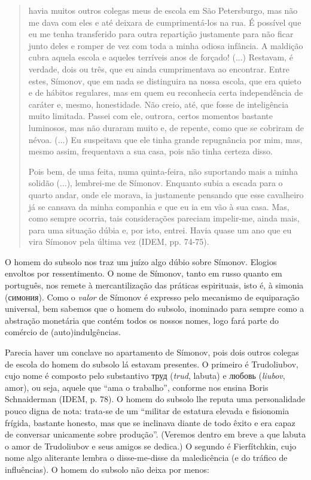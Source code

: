 \begin{quote}
havia muitos outros colegas meus de escola em São Petersburgo, mas não
me dava com eles e até deixara de cumprimentá-los na rua. É possível que
eu me tenha transferido para outra repartição justamente para não ficar
junto deles e romper de vez com toda a minha odiosa infância. A maldição
cubra aquela escola e aqueles terríveis anos de forçado! (...) Restavam,
é verdade, dois ou três, que eu ainda cumprimentava ao encontrar. Entre
estes, Símonov, que em nada se distinguira na nossa escola, que era
quieto e de hábitos regulares, mas em quem eu reconhecia certa
independência de caráter e, mesmo, honestidade. Não creio, até, que
fosse de inteligência muito limitada. Passei com ele, outrora, certos
momentos bastante luminosos, mas não duraram muito e, de repente, como
que se cobriram de névoa. (...) Eu suspeitava que ele tinha grande
repugnância por mim, mas, mesmo assim, frequentava a sua casa, pois não
tinha certeza disso.

Pois bem, de uma feita, numa quinta-feira, não suportando mais a minha
solidão (...), lembrei-me de Símonov. Enquanto subia a escada para o
quarto andar, onde ele morava, ia justamente pensando que esse
cavalheiro já se cansava da minha companhia e que eu ia em vão à sua
casa. Mas, como sempre ocorria, tais considerações pareciam impelir-me,
ainda mais, para uma situação dúbia e, por isto, entrei. Havia quase um
ano que eu vira Símonov pela última vez (IDEM, pp. 74-75).
\end{quote}

O homem do subsolo nos traz um juízo algo dúbio sobre Símonov. Elogios
envoltos por ressentimento. O nome de Símonov, tanto em russo quanto em
português, nos remete à mercantilização das práticas espirituais, isto
é, à simonia
(симония). Como o
\emph{valor} de Símonov é expresso pelo mecanismo de equiparação
universal, bem sabemos que o homem do subsolo, inominado para sempre
como a abstração monetária que contém todos os nossos nomes, logo fará
parte do comércio de (auto)indulgências.

Parecia haver um conclave no apartamento de Símonov, pois dois outros
colegas de escola do homem do subsolo lá estavam presentes. O primeiro é
Trudoliubov, cujo nome é composto pelo substantivo
труд (\emph{trud},
labuta) e любовь
(\emph{liubov}, amor), ou seja, aquele que ``ama o trabalho'', conforme
nos ensina Boris Schnaiderman (IDEM, p. 78). O homem do subsolo lhe
reputa uma personalidade pouco digna de nota: trata-se de um ``militar
de estatura elevada e fisionomia frígida, bastante honesto, mas que se
inclinava diante de todo êxito e era capaz de conversar unicamente sobre
produção''. (Veremos dentro em breve a que labuta o amor de Trudoliubov
e seus amigos se dedica.) O segundo é Fierfítchkin, cujo nome algo
aliterante lembra o disse-me-disse da maledicência (e do tráfico de
influências). O homem do subsolo não deixa por menos:

